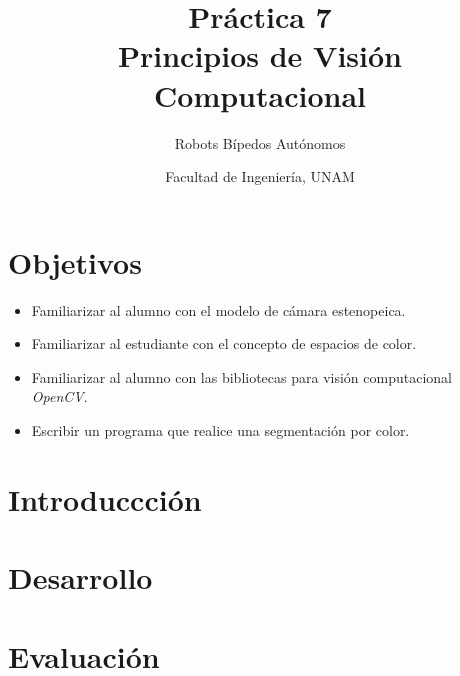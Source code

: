 \documentclass[letterpaper,12pt]{article}
\title{Práctica 7 \\ Principios de Visión Computacional}
\author{Robots Bípedos Autónomos}
\date{Facultad de Ingeniería, UNAM}
\begin{document}
\renewcommand{\tablename}{Tabla}
\maketitle
\section*{Objetivos}
\begin{itemize}
\item Familiarizar al alumno con el modelo de cámara estenopeica.
\item Familiarizar al estudiante con el concepto de espacios de color. 
\item Familiarizar al alumno con las bibliotecas para visión computacional \textit{OpenCV}.
\item Escribir un programa que realice una segmentación por color. 
\end{itemize}

\section{Introduccción}

\section{Desarrollo}

\section{Evaluación}
\end{document}
